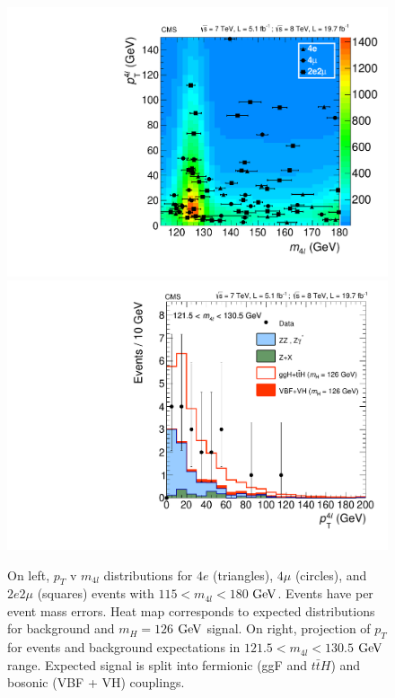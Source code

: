 \begin{figure}[htbp]
\begin{center}
\includegraphics[width=.45\linewidth]{HiggsDiscovery/figures/M4l_vs_pT_all.pdf}
\includegraphics[width=.45\linewidth]{HiggsDiscovery/figures/PT01JetPeak.pdf}
\caption[Observed $p_T$ Distributions for Low Mass $4l$ Events With Signal Expectations]{On left, $p_T$ v $m_{4l}$ distributions for $4e$ (triangles), $4\mu$ (circles), and $2e2\mu$ (squares) events with $115 < m_{4l} < 180$ $\rm{GeV}$. Events have per event mass errors. Heat map corresponds to expected distributions for background and $m_H = 126$ $\rm{GeV}$ signal. On right, projection of $p_T$ for events and background expectations in $121.5 < m_{4l} < 130.5$ $\rm{GeV}$ range. Expected signal is split into fermionic (ggF and $t\bar{t}H$) and bosonic (VBF + VH) couplings.}
\label{fig:pT_Results}
\end{center}
\end{figure}

